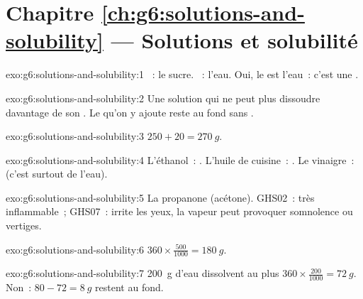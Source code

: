 \section*{Chapitre \ref{ch:g6:solutions-and-solubility} --- Solutions et solubilité}

\begin{solution}{exo:g6:solutions-and-solubility:1}
~: le sucre. ~: l'eau. Oui, le  est l'eau~: c'est
une .
\end{solution}

\begin{solution}{exo:g6:solutions-and-solubility:2}
Une solution qui ne peut plus dissoudre davantage de son . Le
 qu'on y ajoute reste au fond sans .
\end{solution}

\begin{solution}{exo:g6:solutions-and-solubility:3}
$250 + 20 = \qty{270}{g}$.
\end{solution}

\begin{solution}{exo:g6:solutions-and-solubility:4}
L'éthanol~: . L'huile de cuisine~: . Le vinaigre~:
 (c'est surtout de l'eau).
\end{solution}

\begin{solution}{exo:g6:solutions-and-solubility:5}
La propanone (acétone). GHS02~: très inflammable~; GHS07~: irrite les
yeux, la vapeur peut provoquer somnolence ou vertiges.
\end{solution}

\begin{solution}{exo:g6:solutions-and-solubility:6}
$360 \times \frac{500}{1000} = \qty{180}{g}$.
\end{solution}

\begin{solution}{exo:g6:solutions-and-solubility:7}
\qty{200}{g} d'eau dissolvent au plus $360 \times \frac{200}{1000} =
\qty{72}{g}$. Non~: $80 - 72 = \qty{8}{g}$ restent au fond.
\end{solution}

